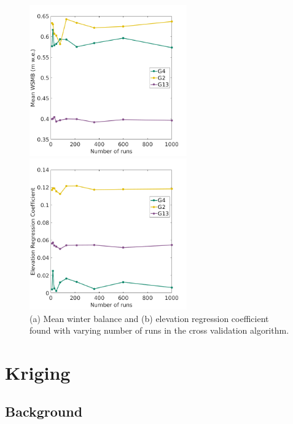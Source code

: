\documentclass{sfuthesis}
\begin{document}
\begin{figure}
\begin{minipage}[l][8cm][t]{.58\textwidth}
        \vspace*{\fill}
  \centering
  \includegraphics[height=6.5cm]{MLRrunWSMB.png}
  \subcaption{}
\end{minipage}%
\begin{minipage}[l][8cm][t]{.38\textwidth}
        \vspace*{\fill} 
          \centering
         \includegraphics[height=6.5cm]{MLRrunCoeffs.png}
  \subcaption{}
  \end{minipage}%

\caption{(a) Mean winter balance and (b) elevation regression coefficient found with varying number of runs in the cross validation algorithm. }
\label{fig:MLRruns}
\end{figure}


\section{Kriging}
\label{sec:kriging}

\subsection{Background}
\end{document}
